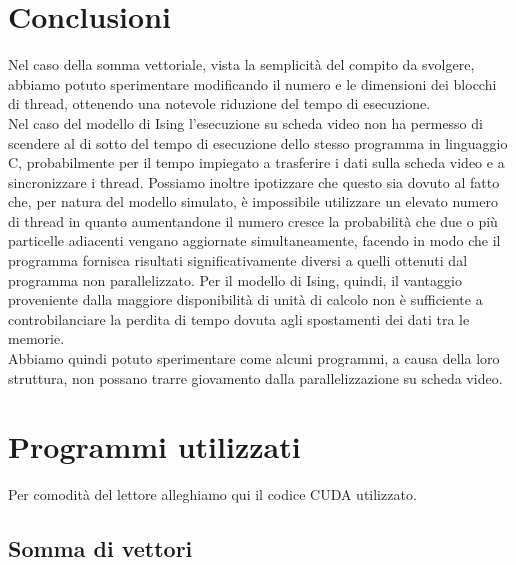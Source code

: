 \documentclass[a4paper,11pt]{article}
\begin{document}
\section{Conclusioni}
Nel caso della somma vettoriale, vista la semplicità del compito da svolgere, abbiamo potuto sperimentare modificando il numero e le dimensioni dei blocchi di thread, ottenendo una notevole riduzione del tempo di esecuzione. \\
Nel caso del modello di Ising l'esecuzione su scheda video non ha permesso di scendere al di sotto del tempo di esecuzione dello stesso programma in linguaggio C, probabilmente per il tempo impiegato a trasferire i dati sulla scheda video e a sincronizzare i thread. Possiamo inoltre ipotizzare che questo sia dovuto al fatto che, per natura del modello simulato, è impossibile utilizzare un elevato numero di thread in quanto aumentandone il numero cresce la probabilità che due o più particelle adiacenti vengano aggiornate simultaneamente, facendo in modo che il programma fornisca risultati significativamente diversi a quelli ottenuti dal programma non parallelizzato. Per il modello di Ising, quindi, il vantaggio proveniente dalla maggiore disponibilità di unità di calcolo non è sufficiente a controbilanciare la perdita di tempo dovuta agli spostamenti dei dati tra le memorie.\\
Abbiamo quindi potuto sperimentare come alcuni programmi, a causa della loro struttura, non possano trarre giovamento dalla parallelizzazione su scheda video.

\section{Programmi utilizzati}
Per comodità del lettore alleghiamo qui il codice CUDA utilizzato.

\subsection{Somma di vettori}
\end{document}
